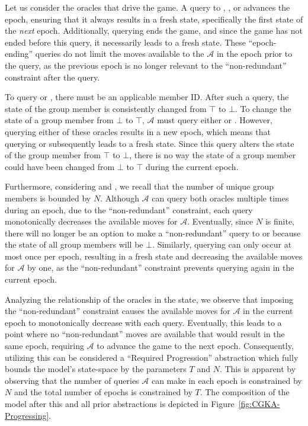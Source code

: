 \documentclass[runningheads]{llncs}
\newcommand{\Adversary}{\ensuremath{\mathcal{A}}\xspace}
\begin{document}
Let us consider the oracles that drive the game. A query to , , or  advances the epoch, ensuring that it always results in a fresh state, specifically the first state of the \emph{next} epoch.
Additionally, querying  ends the game, and since the game has not ended before this query, it necessarily leads to a fresh state.
These ``epoch-ending'' queries do not limit the moves available to the \Adversary in the epoch prior to the query, as the previous epoch is no longer relevant to the ``non-redundant'' constraint after the query.

To query  or , there must be an applicable member ID.
After such a query, the state of the group member is consistently changed from $\top$ to $\bot$.
To change the state of a group member from $\bot$ to $\top$, \Adversary must query either  or .
However, querying either of these oracles results in a new epoch, which means that querying  or  subsequently leads to a fresh state.
Since this query alters the state of the group member from $\top$ to $\bot$, there is no way the state of a group member could have been changed from $\bot$ to $\top$ during the current epoch.

Furthermore, considering  and , we recall that the number of unique group members is bounded by $N$.
Although \Adversary can query both oracles multiple times during an epoch, due to the ``non-redundant'' constraint, each query monotonically decreases the available moves for \Adversary.
Eventually, since $N$ is finite, there will no longer be an option to make a ``non-redundant'' query to  or  because the state of all group members will be $\bot$.
Similarly, querying  can only occur at most once per epoch, resulting in a fresh state and decreasing the available moves for \Adversary by one, as the ``non-redundant'' constraint prevents querying  again in the current epoch.

Analyzing the relationship of the oracles in the \CGKAsec state, we observe that imposing the ``non-redundant'' constraint causes the available moves for \Adversary in the current epoch to monotonically decrease with each query.
Eventually, this leads to a point where no ``non-redundant'' moves are available that would result in the same epoch, requiring \Adversary to advance the game to the next epoch.
Consequently, utilizing this can be considered a ``Required Progression''  abstraction which fully bounds the model's state-space by the parameters $T$ and $N$.
This is apparent by observing that the number of queries \Adversary can make in each epoch is constrained by $N$ and the total number of epochs is constrained by $T$.
The composition of the model after this and all prior abstractions is depicted in Figure~\ref{fig:CGKA-Progressing}.
\end{document}
